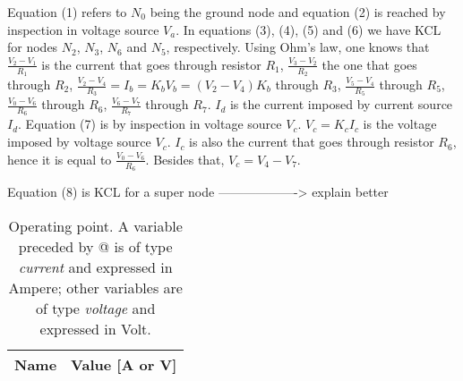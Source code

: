 \par
Equation (1) refers to $N_0$ being the ground node and equation (2) is reached by inspection in voltage source $V_a$. In equations (3), (4), (5) and (6) we have KCL for nodes $N_2$, $N_3$, $N_6$ and $N_5$, respectively.  Using Ohm's law, one knows that $\frac{V_2 - V_1}{R_1}$ is the current that goes through resistor $R_1$, $\frac{V_3-V_2}{R_2}$ the one that goes through $R_2$, $\frac{V_2-V_4}{R_3} = I_b = K_b V_b = (V_2-V_4)K_b$ through $R_3$, $\frac{V_5-V_4}{R_5}$ through $R_5$, $\frac{V_0-V_6}{R_6}$ through $R_6$, $\frac{V_6-V_7}{R_7}$ through $R_7$. $I_d$ is the current imposed by current source $I_d$. Equation (7) is by inspection in voltage source $V_c$. $V_c = K_c I_c$ is the voltage imposed by voltage source $V_c$. $I_c$ is also the current that goes through resistor $R_6$, hence it is equal to $\frac{V_0 - V_6}{R_6}$. Besides that, $V_c = V_4-V_7$.

Equation (8) is KCL for a super node -------------------> explain better




\begin{table}[hbt!]
  \centering
  \begin{tabular}{|c|c|}
    \hline    
    {\bf Name} & {\bf Value [A or V]} \\ \hline
    
  \end{tabular}
  \caption{Operating point. A variable preceded by @ is of type {\em current}
    and expressed in Ampere; other variables are of type {\it voltage} and expressed in
    Volt.}
  \label{tab:op}
\end{table}


